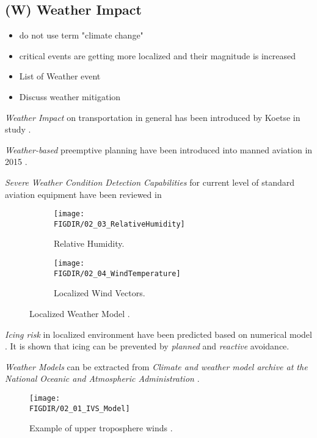 \subsection{(W) Weather Impact}\label{sec:WeatherImpact}

    \begin{itemize}
        \item do not use term "climate change"
        \item critical events are getting more localized and their magnitude is increased
        \item List of Weather event
        \item Discuss weather mitigation
    \end{itemize}
    
    \emph{Weather Impact} on transportation in general has been introduced by Koetse in study \cite{koetse2009impact}.
    
    \emph{Weather-based} preemptive planning have been introduced into manned aviation in 2015 \cite{yamashita2015climate}. 
    
    \emph{Severe Weather Condition Detection Capabilities} for current level of standard aviation equipment have been reviewed in \cite{smith2016multi} 
    
    \begin{figure}[H]
	\centering
	\begin{subfigure}{0.45\textwidth}
		\texttt{[image: \\FIGDIR/02\_03\_RelativeHumidity]}
		\caption{Relative Humidity.} 
	\end{subfigure}
	\vspace{1em} 
	\begin{subfigure}{0.45\textwidth} %
		\texttt{[image: \\FIGDIR/02\_04\_WindTemperature]}
		\caption{Localized Wind Vectors.} %
	\end{subfigure}
	\caption{Localized Weather Model \cite{balaban2017dynamic}.} %
    \end{figure}
    
    \emph{Icing risk} in localized environment have been predicted based on numerical model \cite{thompson2017numerical}. It is shown that icing can be prevented by \emph{planned} and \emph{reactive} avoidance.
    
    \emph{Weather Models} can be extracted from \emph{Climate and weather model archive at the National Oceanic and Atmospheric Administration} \cite{rutledge2006nomads}.
    
    \begin{figure}[H]
        \centering
        \texttt{[image: \\FIGDIR/02\_01\_IVS\_Model]}
        \caption{Example of upper troposphere winds \cite{rutledge2006nomads}.}
        \label{fig:ExampleOfTroposphereWinds}
    \end{figure}

